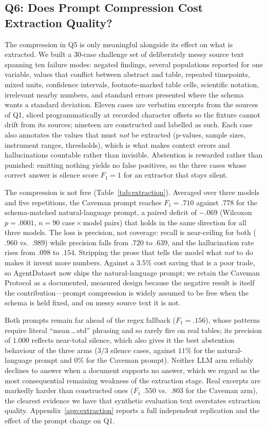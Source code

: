 \documentclass[letterpaper]{article} %
\begin{document}
\subsection{Q6: Does Prompt Compression Cost Extraction Quality?}
The compression in Q5 is only meaningful alongside its effect on what is
extracted. We built a 30-case challenge set of deliberately messy source text
spanning ten failure modes: negated findings, several populations reported for
one variable, values that conflict between abstract and table, repeated
timepoints, mixed units, confidence intervals, footnote-marked table cells,
scientific notation, irrelevant nearby numbers, and standard errors presented
where the schema wants a standard deviation. Eleven cases are verbatim excerpts
from the sources of Q1, sliced programmatically at recorded character offsets so
the fixture cannot drift from its sources; nineteen are constructed and labelled
as such. Each case also annotates the values that must \emph{not} be extracted
(p-values, sample sizes, instrument ranges, thresholds), which is what makes
context errors and hallucinations countable rather than invisible. Abstention is
rewarded rather than punished: emitting nothing yields no false positives, so the
three cases whose correct answer is silence score $F_1{=}1$ for an extractor that
stays silent.

The compression is not free (Table~\ref{tab:extraction}). Averaged over three
models and five repetitions, the Caveman prompt reaches $F_1=.710$ against $.778$
for the schema-matched natural-language prompt, a paired deficit of $-.069$
(Wilcoxon $p=.0001$, $n=90$ case\,$\times$\,model pairs) that holds in the same
direction for all three models. The loss is precision, not coverage: recall is
near-ceiling for both ($.960$ vs.\ $.989$) while precision falls from $.720$ to
$.639$, and the hallucination rate rises from $.098$ to $.154$. Stripping the
prose that tells the model what \emph{not} to do makes it invent more numbers.
Against a $3.5\%$ cost saving that is a poor trade, so AgentDataset now ships the
natural-language prompt; we retain the Caveman Protocol as a documented, measured
design because the negative result is itself the contribution---prompt
compression is widely assumed to be free when the schema is held fixed, and on
messy source text it is not.

Both prompts remain far ahead of the regex fallback ($F_1=.156$), whose patterns
require literal ``mean\,\ldots\,std'' phrasing and so rarely fire on real tables;
its precision of $1.000$ reflects near-total silence, which also gives it the best
abstention behaviour of the three arms ($3/3$ silence cases, against $11\%$ for
the natural-language prompt and $0\%$ for the Caveman prompt). Neither LLM arm
reliably declines to answer when a document supports no answer, which we regard
as the most consequential remaining weakness of the extraction stage. Real
excerpts are markedly harder than constructed ones ($F_1$ $.550$ vs.\ $.803$ for
the Caveman arm), the clearest evidence we have that synthetic evaluation text
overstates extraction quality. Appendix~\ref{app:extraction} reports a full
independent replication and the effect of the prompt change on Q1.
\end{document}
